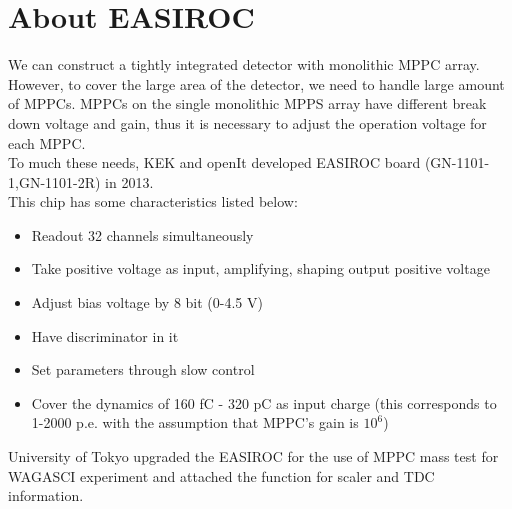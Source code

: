 
\section{About EASIROC} \label{introduction}
We can construct a tightly integrated detector with monolithic MPPC array. 
However, to cover the large area of the detector, we need to handle large amount of MPPCs. 
MPPCs on the single monolithic MPPS array have different break down voltage and gain, thus it is necessary to adjust the operation voltage for each MPPC.\\
To much these needs, KEK and openIt developed EASIROC board (GN-1101-1,GN-1101-2R) in 2013.\\
This chip has some characteristics listed below:

\begin{itemize}
\item Readout 32 channels simultaneously
\item Take positive voltage as input, amplifying, shaping output positive voltage
\item Adjust bias voltage by 8 bit (0-4.5 V)
\item Have discriminator in it
\item Set parameters through slow control
\item Cover the dynamics of 160 fC - 320 pC as input charge (this corresponds to 1-2000 p.e. with the assumption that MPPC's gain is $10^6$) 
\end{itemize}

University of Tokyo upgraded the EASIROC for the use of MPPC mass test for WAGASCI experiment and attached the function for scaler and TDC information.
